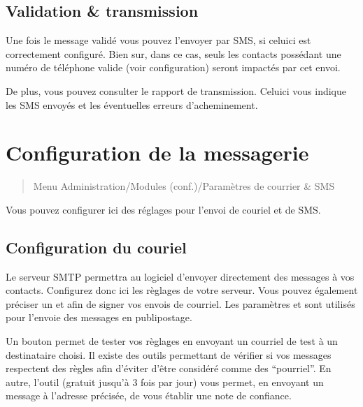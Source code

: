 \documentclass[a4paper,10pt,oneside,french]{sphinxmanual}
\begin{document}
\subsection{Validation \& transmission}
\label{\detokenize{mailing/sms:validation-transmission}}
\sphinxAtStartPar
Une fois le message validé vous pouvez l’envoyer par SMS, si celui\sphinxhyphen{}ci est correctement configuré.
Bien sur, dans ce cas, seuls les contacts possédant une numéro de téléphone valide (voir configuration) seront impactés par cet envoi.

\sphinxAtStartPar
De plus, vous pouvez consulter le rapport de transmission.
Celui\sphinxhyphen{}ci vous indique les SMS envoyés et les éventuelles erreurs d’acheminement.

\sphinxstepscope


\section{Configuration de la messagerie}
\label{\detokenize{mailing/configuration:configuration-de-la-messagerie}}\label{\detokenize{mailing/configuration::doc}}\begin{quote}

\sphinxAtStartPar
Menu Administration/Modules (conf.)/Paramètres de courrier \& SMS
\end{quote}

\sphinxAtStartPar
Vous pouvez configurer ici des réglages pour l’envoi de couriel et de SMS.


\subsection{Configuration du couriel}
\label{\detokenize{mailing/configuration:configuration-du-couriel}}
\sphinxAtStartPar
Le serveur SMTP permettra au logiciel d’envoyer directement des messages à vos contacts.
Configurez donc ici les règlages de votre serveur.
Vous pouvez également préciser un  et  afin de signer vos envois de courriel.
Les paramètres  et  sont utilisés pour l’envoie des messages en publipostage.

\sphinxAtStartPar
Un bouton  permet de tester vos règlages en envoyant un courriel de test à un destinataire choisi.
Il existe des outils permettant de vérifier si vos messages respectent des règles afin d’éviter d’être considéré comme des “pourriel”.
En autre, l’outil  (gratuit jusqu’à 3 fois par jour) vous permet, en envoyant un message à l’adresse précisée, de vous établir une note de confiance.
\end{document}
